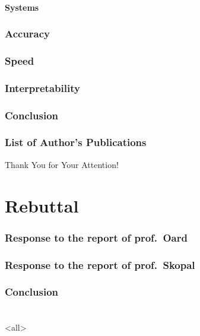 \subsection{Systems}
\begin{frame}{\secname}
\end{frame}

\section{Accuracy}
\section{Speed}
\section{Interpretability}
\section{Conclusion}
\section{List of Author's Publications}

\begin{frame}[plain]
\vfill
\centerline{Thank You for Your Attention!}
\vfill\vfill
\end{frame}

\part{Rebuttal}
\frame{\vfill\partpage\vfill}

\section{Response to the report of prof.\ Oard}
\section{Response to the report of prof.\ Skopal}
\section{Conclusion}

\part{\bibname}
\frame{\vfill\partpage\vfill}

\section{\bibname}
\begin{frame}[allowframebreaks]{\bibname}
\printbibliography[heading=none]
\end{frame}

\mode
<all>